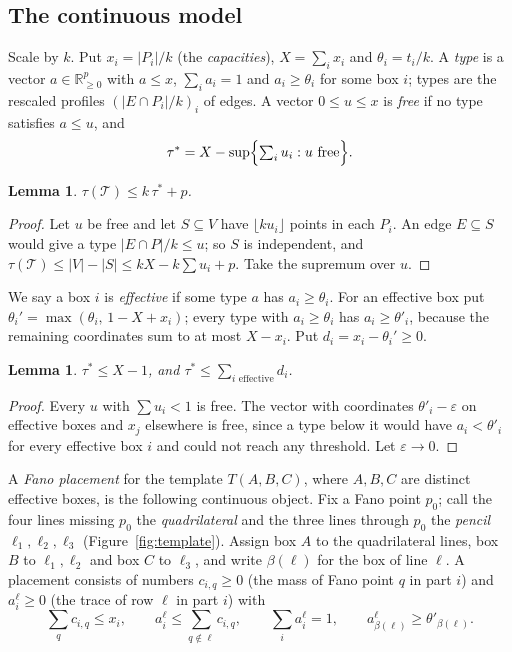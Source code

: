 \documentclass[11pt]{amsart}
\newtheorem{lemma}[theorem]{Lemma}
\theoremstyle{definition}
\theoremstyle{remark}
\begin{document}
\subsection{The continuous model}
Scale by $k$. Put $x_i=|P_i|/k$ (the \emph{capacities}), $X=\sum_ix_i$ and $\theta_i=t_i/k$. A \emph{type} is a vector $a\in\mathbb R^p_{\ge0}$ with $a\le x$, $\sum_ia_i=1$ and $a_i\ge\theta_i$ for some box $i$; types are the rescaled profiles $(|E\cap P_i|/k)_i$ of edges. A vector $0\le u\le x$ is \emph{free} if no type satisfies $a\le u$, and
\[
\tau^*=X-\sup\Bigl\{\textstyle\sum_iu_i: u\text{ free}\Bigr\}.
\]

\begin{lemma}\label{lem:tauint}
$\tau(\mathcal T)\le k\,\tau^*+p$.
\end{lemma}

\begin{proof}
Let $u$ be free and let $S\subseteq V$ have $\lfloor ku_i\rfloor$ points in each $P_i$. An edge $E\subseteq S$ would give a type $|E\cap P|/k\le u$; so $S$ is independent, and $\tau(\mathcal T)\le|V|-|S|\le kX-k\sum u_i+p$. Take the supremum over $u$.
\end{proof}

We say a box $i$ is \emph{effective} if some type $a$ has $a_i\ge\theta_i$. For an effective box put $\theta_i'=\max(\theta_i,\,1-X+x_i)$; every type with $a_i\ge\theta_i$ has $a_i\ge\theta'_i$, because the remaining coordinates sum to at most $X-x_i$. Put $d_i=x_i-\theta_i'\ge0$.

\begin{lemma}\label{lem:freevector}
$\tau^*\le X-1$, and $\tau^*\le\sum_{i\text{ effective}}d_i$.
\end{lemma}

\begin{proof}
Every $u$ with $\sum u_i<1$ is free. The vector with coordinates $\theta'_i-\varepsilon$ on effective boxes and $x_j$ elsewhere is free, since a type below it would have $a_i<\theta'_i$ for every effective box $i$ and could not reach any threshold. Let $\varepsilon\to0$.
\end{proof}

A \emph{Fano placement} for the template $T(A,B,C)$, where $A,B,C$ are distinct effective boxes, is the following continuous object. Fix a Fano point $p_0$; call the four lines missing $p_0$ the \emph{quadrilateral} and the three lines through $p_0$ the \emph{pencil} $\ell_1,\ell_2,\ell_3$ (Figure~\ref{fig:template}). Assign box $A$ to the quadrilateral lines, box $B$ to $\ell_1,\ell_2$ and box $C$ to $\ell_3$, and write $\beta(\ell)$ for the box of line $\ell$. A placement consists of numbers $c_{i,q}\ge0$ (the mass of Fano point $q$ in part $i$) and $a^\ell_i\ge0$ (the trace of row $\ell$ in part $i$) with
\begin{equation}\label{eq:placement}
\sum_qc_{i,q}\le x_i,\qquad a^\ell_i\le\sum_{q\notin\ell}c_{i,q},\qquad\sum_ia^\ell_i=1,\qquad a^\ell_{\beta(\ell)}\ge\theta'_{\beta(\ell)} .
\end{equation}
\end{document}
